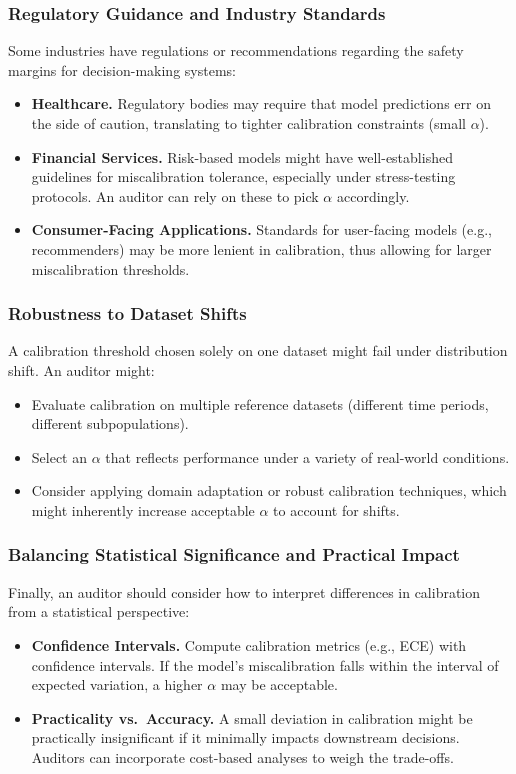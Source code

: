 \subsubsection{Regulatory Guidance and Industry Standards}

Some industries have regulations or recommendations regarding the safety margins for decision-making systems:
\begin{itemize}
    \item \textbf{Healthcare.} Regulatory bodies may require that model predictions err on the side of caution, translating to tighter calibration constraints (small $\alpha$).
    \item \textbf{Financial Services.} Risk-based models might have well-established guidelines for miscalibration tolerance, especially under stress-testing protocols. An auditor can rely on these to pick $\alpha$ accordingly.
    \item \textbf{Consumer-Facing Applications.} Standards for user-facing models (e.g., recommenders) may be more lenient in calibration, thus allowing for larger miscalibration thresholds.
\end{itemize}

\subsubsection{Robustness to Dataset Shifts}

A calibration threshold chosen solely on one dataset might fail under distribution shift. An auditor might:
\begin{itemize}
    \item Evaluate calibration on multiple reference datasets (different time periods, different subpopulations).
    \item Select an $\alpha$ that reflects performance under a variety of real-world conditions.
    \item Consider applying domain adaptation or robust calibration techniques, which might inherently increase acceptable $\alpha$ to account for shifts.
\end{itemize}

\subsubsection{Balancing Statistical Significance and Practical Impact}

Finally, an auditor should consider how to interpret differences in calibration from a statistical perspective:
\begin{itemize}
    \item \textbf{Confidence Intervals.} Compute calibration metrics (e.g., ECE) with confidence intervals. If the model’s miscalibration falls within the interval of expected variation, a higher $\alpha$ may be acceptable.
    \item \textbf{Practicality vs.\ Accuracy.} A small deviation in calibration might be practically insignificant if it minimally impacts downstream decisions. Auditors can incorporate cost-based analyses to weigh the trade-offs.
\end{itemize}

